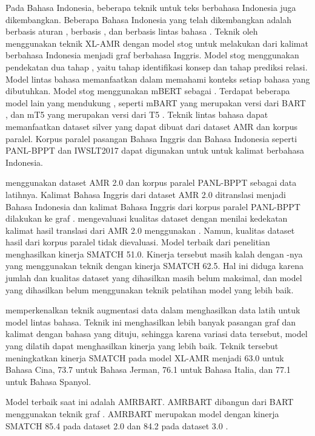 Pada Bahasa Indonesia, beberapa teknik \amrparsing{} untuk teks berbahasa Indonesia juga dikembangkan.
Beberapa \amrparsing{} Bahasa Indonesia yang telah dikembangkan adalah \amrparsing{} berbasis aturan , berbasis  , dan berbasis lintas bahasa .
Teknik \amrparsing{} oleh \textcite{putra2022} menggunakan teknik  \gls{XL-AMR}  dengan model \gls{stog}  untuk melakukan \amrparsing{} dari kalimat berbahasa Indonesia menjadi graf \AMR{} berbahasa Inggris.
Model \gls{stog} menggunakan pendekatan dua tahap , yaitu tahap identifikasi konsep dan tahap prediksi relasi.
Model \amrparsing{} lintas bahasa memanfaatkan \mwordem{} dalam memahami konteks setiap bahasa yang dibutuhkan.
Model \gls{stog} menggunakan mBERT  sebagai \mwordem{}.
Terdapat beberapa model lain yang mendukung \mwordem{}, seperti mBART  yang merupakan versi \multil{} dari \gls{BART} , dan mT5  yang merupakan versi \multil{} dari T5 .
Teknik \amrparsing{} lintas bahasa dapat memanfaatkan dataset silver yang dapat dibuat dari dataset AMR dan korpus paralel.
Korpus paralel pasangan Bahasa Inggris dan Bahasa Indonesia seperti PANL-BPPT  dan IWSLT2017  dapat digunakan untuk \amrparsing{} untuk kalimat berbahasa Indonesia.

\textcite{putra2022} menggunakan dataset AMR 2.0 dan korpus paralel PANL-BPPT sebagai data latihnya.
Kalimat Bahasa Inggris dari dataset AMR 2.0 ditranslasi menjadi Bahasa Indonesia dan kalimat Bahasa Inggris dari korpus paralel PANL-BPPT dilakukan  ke graf \AMR{}.
\textcite{putra2022} mengevaluasi kualitas dataset dengan menilai kedekatan kalimat hasil translasi dari AMR 2.0 menggunakan \cossim{}.
Namun, kualitas dataset hasil \amrparsing{} dari korpus paralel tidak dievaluasi.
Model terbaik dari penelitian \textcite{putra2022} menghasilkan kinerja SMATCH 51.0.
Kinerja tersebut masih kalah dengan -nya yang menggunakan teknik  dengan kinerja SMATCH 62.5.
Hal ini diduga karena jumlah dan kualitas dataset yang dihasilkan masih belum maksimal, dan model yang dihasilkan belum menggunakan teknik pelatihan model yang lebih baik.

\textcite{lee2022} memperkenalkan teknik augmentasi data dalam menghasilkan data latih untuk model \amrparsing{} lintas bahasa.
Teknik ini menghasilkan lebih banyak pasangan graf \AMR{} dan kalimat dengan bahasa yang dituju, sehingga karena variasi data tersebut, model yang dilatih dapat menghasilkan kinerja yang lebih baik.
Teknik tersebut meningkatkan kinerja SMATCH pada model XL-AMR  menjadi 63.0 untuk Bahasa Cina, 73.7 untuk Bahasa Jerman, 76.1 untuk Bahasa Italia, dan 77.1 untuk Bahasa Spanyol.

Model \amrparsing{} terbaik saat ini adalah \gls{AMRBART}.
\gls{AMRBART} dibangun dari  \gls{BART} menggunakan teknik graf \pretraining{}.
\gls{AMRBART} merupakan model \sota{} dengan kinerja SMATCH 85.4 pada dataset \AMR{} 2.0 dan 84.2 pada dataset \AMR{} 3.0 .

